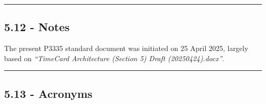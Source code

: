\documentclass[
]{article}
\begin{document}
\begin{center}\rule{0.5\linewidth}{0.5pt}\end{center}

\subsection{5.12 - Notes}\label{notes}

The present P3335 standard document was initiated on 25 April 2025,
largely based on \emph{``TimeCard Architecture (Section 5) Draft
(20250424).docx''}.

\begin{center}\rule{0.5\linewidth}{0.5pt}\end{center}

\subsection{5.13 - Acronyms}\label{acronyms}
\end{document}
